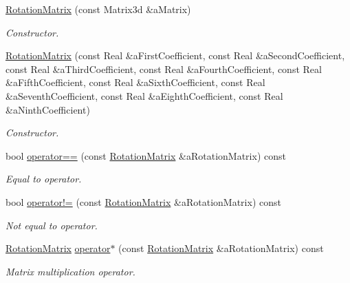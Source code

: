 \begin{DoxyCompactItemize}
\item 
\hyperlink{classlibrary_1_1math_1_1geom_1_1trf_1_1rot_1_1_rotation_matrix_a667d2c05aa5b0cc88775938d11164cdc}{Rotation\+Matrix} (const Matrix3d \&a\+Matrix)
\begin{DoxyCompactList}\small\item\em Constructor. \end{DoxyCompactList}\item 
\hyperlink{classlibrary_1_1math_1_1geom_1_1trf_1_1rot_1_1_rotation_matrix_a3b3c098f07de0f6f4e02fc78be368add}{Rotation\+Matrix} (const Real \&a\+First\+Coefficient, const Real \&a\+Second\+Coefficient, const Real \&a\+Third\+Coefficient, const Real \&a\+Fourth\+Coefficient, const Real \&a\+Fifth\+Coefficient, const Real \&a\+Sixth\+Coefficient, const Real \&a\+Seventh\+Coefficient, const Real \&a\+Eighth\+Coefficient, const Real \&a\+Ninth\+Coefficient)
\begin{DoxyCompactList}\small\item\em Constructor. \end{DoxyCompactList}\item 
bool \hyperlink{classlibrary_1_1math_1_1geom_1_1trf_1_1rot_1_1_rotation_matrix_a77fcfc0ab8ee5a5a47320a2315201461}{operator==} (const \hyperlink{classlibrary_1_1math_1_1geom_1_1trf_1_1rot_1_1_rotation_matrix}{Rotation\+Matrix} \&a\+Rotation\+Matrix) const
\begin{DoxyCompactList}\small\item\em Equal to operator. \end{DoxyCompactList}\item 
bool \hyperlink{classlibrary_1_1math_1_1geom_1_1trf_1_1rot_1_1_rotation_matrix_a28996f6b0def32867b58931e1c804b4f}{operator!=} (const \hyperlink{classlibrary_1_1math_1_1geom_1_1trf_1_1rot_1_1_rotation_matrix}{Rotation\+Matrix} \&a\+Rotation\+Matrix) const
\begin{DoxyCompactList}\small\item\em Not equal to operator. \end{DoxyCompactList}\item 
\hyperlink{classlibrary_1_1math_1_1geom_1_1trf_1_1rot_1_1_rotation_matrix}{Rotation\+Matrix} \hyperlink{classlibrary_1_1math_1_1geom_1_1trf_1_1rot_1_1_rotation_matrix_a3c96da7d3e74ab43f2cce4a65bfc934a}{operator$\ast$} (const \hyperlink{classlibrary_1_1math_1_1geom_1_1trf_1_1rot_1_1_rotation_matrix}{Rotation\+Matrix} \&a\+Rotation\+Matrix) const
\begin{DoxyCompactList}\small\item\em Matrix multiplication operator. \end{DoxyCompactList}\item 

\end{DoxyCompactItemize}
